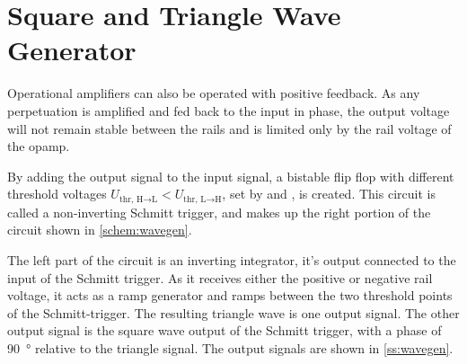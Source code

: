 \section{Square and Triangle Wave Generator}

Operational amplifiers can also be operated with positive feedback.
As any perpetuation is amplified and fed back to the input in phase, the output voltage will not remain stable between the rails and is limited only by the rail voltage of the opamp.

By adding the output signal to the input signal, a bistable flip flop with different threshold voltages $U_{\text{thr, H} \rightarrow \text{L}} < U_{\text{thr, L} \rightarrow \text{H}}$, set by  and , is created.
This circuit is called a non-inverting Schmitt trigger, and makes up the right portion of the circuit shown in \autoref{schem:wavegen}.

The left part of the circuit is an inverting integrator, it's output connected to the input of the Schmitt trigger.
As it receives either the positive or negative rail voltage, it acts as a ramp generator and ramps between the two threshold points of the Schmitt-trigger.
The resulting triangle wave is one output signal.
The other output signal is the square wave output of the Schmitt trigger, with a phase of \SI{90}{\degree} relative to the triangle signal.
The output signals are shown in \autoref{ss:wavegen}.

